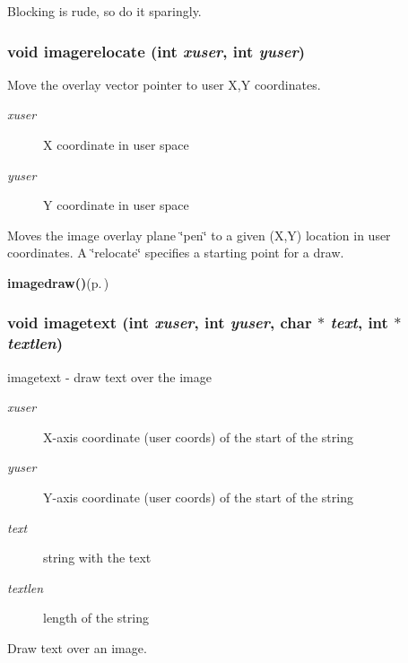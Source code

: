 Blocking is rude, so do it sparingly. 
\subsubsection{\setlength{\rightskip}{0pt plus 5cm}void imagerelocate (int {\em xuser}, int {\em yuser})}\label{xtvutils_8c_a178}


Move the overlay vector pointer to user X,Y coordinates. 

\begin{Desc}
\item[Parameters:]
\begin{description}
\item[{\em xuser}]X coordinate in user space \item[{\em yuser}]Y coordinate in user space\end{description}
\end{Desc}
Moves the image overlay plane \char`\"{}pen\char`\"{} to a given (X,Y) location in user coordinates. A \char`\"{}relocate\char`\"{} specifies a starting point for a draw.

\begin{Desc}
\item[See also:]{\bf imagedraw()}{\rm (p.\,\pageref{xtv_8h_a73})} \end{Desc}
\subsubsection{\setlength{\rightskip}{0pt plus 5cm}void {\bf imagetext} (int {\em xuser}, int {\em yuser}, char $\ast$ {\em text}, int $\ast$ {\em textlen})}\label{xtvutils_8c_a175}


imagetext - draw text over the image 

\begin{Desc}
\item[Parameters:]
\begin{description}
\item[{\em xuser}]X-axis coordinate (user coords) of the start of the string \item[{\em yuser}]Y-axis coordinate (user coords) of the start of the string \item[{\em text}]string with the text \item[{\em textlen}]length of the string\end{description}
\end{Desc}
Draw text over an image. 
